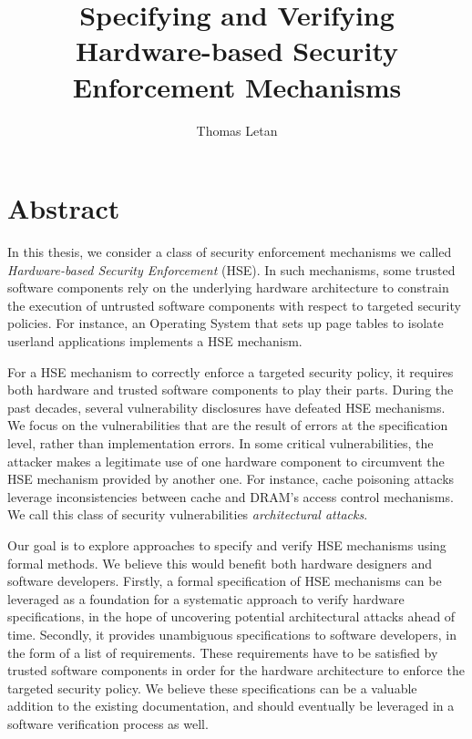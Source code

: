 \documentclass{article}
\title{Specifying and Verifying Hardware-based Security Enforcement Mechanisms}
\author{Thomas Letan}
\date{}
\begin{document}
\maketitle

\section{Abstract}

In this thesis, we consider a class of security enforcement mechanisms we called
\emph{Hardware-based Security Enforcement} (HSE).
%
In such mechanisms, some trusted software components rely on the underlying
hardware architecture to constrain the execution of untrusted software
components with respect to targeted security policies.
%
For instance, an Operating System that sets up page tables to isolate userland
applications implements a HSE mechanism.

For a HSE mechanism to correctly enforce a targeted security policy, it requires
both hardware and trusted software components to play their parts.
%
During the past decades, several vulnerability disclosures have defeated HSE
mechanisms.
%
We focus on the vulnerabilities that are the result of errors at the
specification level, rather than implementation errors.
%
In some critical vulnerabilities, the attacker makes a legitimate use of one
hardware component to circumvent the HSE mechanism provided by another one.
%
For instance, cache poisoning attacks leverage inconsistencies between cache
and DRAM's access control mechanisms.
%
We call this class of security vulnerabilities \emph{architectural attacks}.

Our goal is to explore approaches to specify and verify HSE mechanisms using
formal methods.
%
We believe this would benefit both hardware designers and software developers.
%
Firstly, a formal specification of HSE mechanisms can be leveraged as a
foundation for a systematic approach to verify hardware specifications, in the
hope of uncovering potential architectural attacks ahead of time.
%
Secondly, it provides unambiguous specifications to software developers, in the
form of a list of requirements.
%
These requirements have to be satisfied by trusted software components in order
for the hardware architecture to enforce the targeted security policy.
%
We believe these specifications can be a valuable addition to the existing
documentation, and should eventually be leveraged in a software verification
process as well.
%
\end{document}
